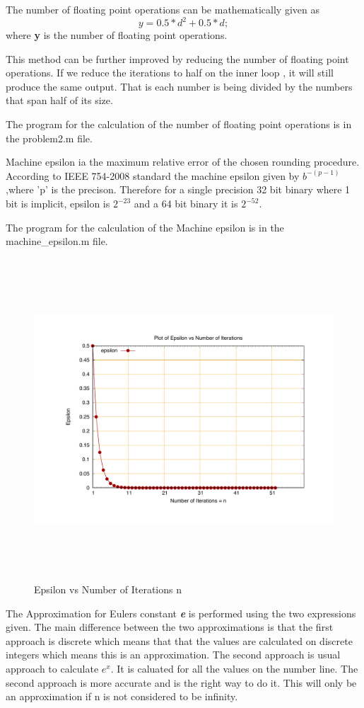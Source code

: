 \documentclass[fleqn,letterpaper,12pt]{report}
\begin{document}
The number of floating point operations can be mathematically given as $$y = 0.5*d^2 + 0.5*d ;$$
where {\bf y} is the number of floating point operations.

This method can be further improved by reducing the number of floating point operations. If we reduce the iterations to half on the inner loop , it will still produce the same output. That is each number is being divided by the numbers that span half of its size. 

The program for the calculation of the number of floating point operations is in the {\color{blue} problem2.m} file.
%
\newpage
{}
{}
\problem
Machine epsilon ia the maximum relative error of the chosen rounding procedure. According to IEEE 754-2008 standard the machine epsilon given by  $ b^{-(p-1)} $ ,where 'p' is the precison. Therefore for a single precision 32 bit binary where 1 bit is implicit, epsilon is $ 2^{-23} $ and a 64 bit binary it is $ 2^{-52} $.

The program for the calculation of the Machine epsilon is in the {\color{blue} machine\_epsilon.m} file.
\begin{figure}[ht!]
	\centering
	\includegraphics[height=120mm,width=160mm]{machine_epsilon.pdf}
	\caption{Epsilon vs Number of Iterations n\label{overflow}}
\end{figure}

%
\newpage
{}
{}
\problem
The Approximation for Eulers constant {\bf \em e} is performed using the two expressions given. The main difference between the two approximations is that the first approach is discrete which means that that the values are calculated on discrete integers which means this is an approximation. The second approach is usual approach to calculate $ e^x$. It is caluated for all the values on the number line. The second approach is more accurate and is the right way to do it. This will only be an approximation if n is not considered to be infinity.
\end{document}
